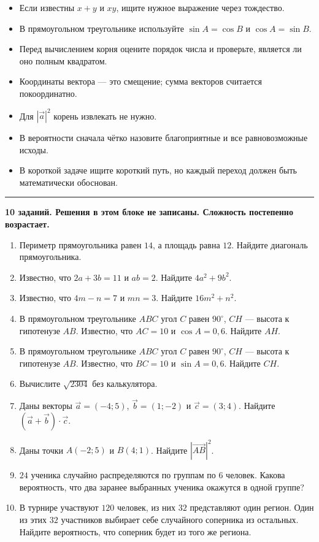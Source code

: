 \documentclass[a4paper,12pt]{article}
\newcommand{\topic}[1]{%
  \vspace{0.45em}\noindent{\Large\bfseries\color{darkaccent}#1}\par\vspace{0.2em}
  {\color{accent}\rule{\linewidth}{0.6pt}}\vspace{0.35em}
}
\begin{document}
\begin{itemize}
  \item Если известны $x+y$ и $xy$, ищите нужное выражение через тождество.
  \item В прямоугольном треугольнике используйте $\sin A=\cos B$ и $\cos A=\sin B$.
  \item Перед вычислением корня оцените порядок числа и проверьте, является ли оно полным квадратом.
  \item Координаты вектора --- это смещение; сумма векторов считается покоординатно.
  \item Для $|\vec a|^2$ корень извлекать не нужно.
  \item В вероятности сначала чётко назовите благоприятные и все равновозможные исходы.
  \item В короткой задаче ищите короткий путь, но каждый переход должен быть математически обоснован.
\end{itemize}

\clearpage
\topic{Тренировочный блок --- Путь А}

\textbf{10 заданий. Решения в этом блоке не записаны. Сложность постепенно возрастает.}

\begin{enumerate}
  \item Периметр прямоугольника равен $14$, а площадь равна $12$. Найдите диагональ прямоугольника.

  \item Известно, что $2a+3b=11$ и $ab=2$. Найдите $4a^2+9b^2$.

  \item Известно, что $4m-n=7$ и $mn=3$. Найдите $16m^2+n^2$.

  \item В прямоугольном треугольнике $ABC$ угол $C$ равен $90^\circ$, $CH$ --- высота к гипотенузе $AB$. Известно, что $AC=10$ и $\cos A=0{,}6$. Найдите $AH$.

  \item В прямоугольном треугольнике $ABC$ угол $C$ равен $90^\circ$, $CH$ --- высота к гипотенузе $AB$. Известно, что $BC=10$ и $\sin A=0{,}6$. Найдите $CH$.

  \item Вычислите $\sqrt{2304}$ без калькулятора.

  \item Даны векторы $\vec a=(-4;5)$, $\vec b=(1;-2)$ и $\vec c=(3;4)$. Найдите $(\vec a+\vec b)\cdot\vec c$.

  \item Даны точки $A(-2;5)$ и $B(4;1)$. Найдите $|\overrightarrow{AB}|^2$.

  \item $24$ ученика случайно распределяются по группам по $6$ человек. Какова вероятность, что два заранее выбранных ученика окажутся в одной группе?

  \item В турнире участвуют $120$ человек, из них $32$ представляют один регион. Один из этих $32$ участников выбирает себе случайного соперника из остальных. Найдите вероятность, что соперник будет из того же региона.
\end{enumerate}
\end{document}
